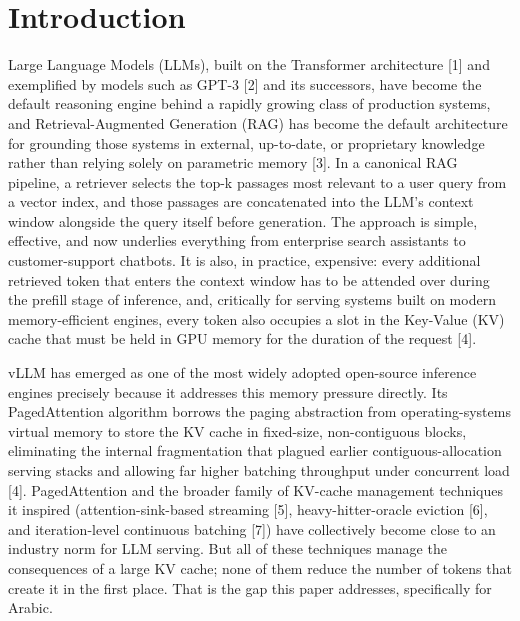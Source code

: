 \section{Introduction}
Large Language Models (LLMs), built on the Transformer architecture [1] and exemplified by models such as GPT-3 [2] and its successors, have become the default reasoning engine behind a rapidly growing class of production systems, and Retrieval-Augmented Generation (RAG) has become the default architecture for grounding those systems in external, up-to-date, or proprietary knowledge rather than relying solely on parametric memory [3]. In a canonical RAG pipeline, a retriever selects the top-k passages most relevant to a user query from a vector index, and those passages are concatenated into the LLM's context window alongside the query itself before generation. The approach is simple, effective, and now underlies everything from enterprise search assistants to customer-support chatbots. It is also, in practice, expensive: every additional retrieved token that enters the context window has to be attended over during the prefill stage of inference, and, critically for serving systems built on modern memory-efficient engines, every token also occupies a slot in the Key-Value (KV) cache that must be held in GPU memory for the duration of the request [4].

vLLM has emerged as one of the most widely adopted open-source inference engines precisely because it addresses this memory pressure directly. Its PagedAttention algorithm borrows the paging abstraction from operating-systems virtual memory to store the KV cache in fixed-size, non-contiguous blocks, eliminating the internal fragmentation that plagued earlier contiguous-allocation serving stacks and allowing far higher batching throughput under concurrent load [4]. PagedAttention and the broader family of KV-cache management techniques it inspired (attention-sink-based streaming [5], heavy-hitter-oracle eviction [6], and iteration-level continuous batching [7]) have collectively become close to an industry norm for LLM serving. But all of these techniques manage the consequences of a large KV cache; none of them reduce the number of tokens that create it in the first place. That is the gap this paper addresses, specifically for Arabic.

